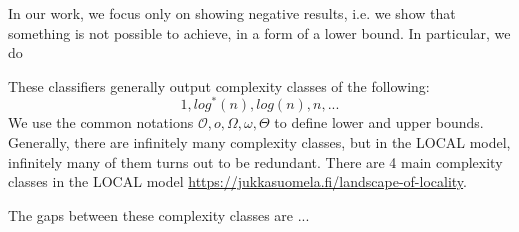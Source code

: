 In our work, we focus only on showing negative results, i.e. we show that something is not possible to achieve, in a form of a lower bound.
In particular, we do

These classifiers generally output complexity classes of the following:
\[1, log^*(n), log(n), n, ...\]
\todo{}
We use the common notations \(\mathcal{O}, o, \Omega, \omega, \Theta \) to define lower and upper bounds.
Generally, there are infinitely many complexity classes, but in the LOCAL model, infinitely many of them turns out to be redundant.
There are 4 main complexity classes in the LOCAL model \url{https://jukkasuomela.fi/landscape-of-locality}.

The gaps between these complexity classes are ... 
